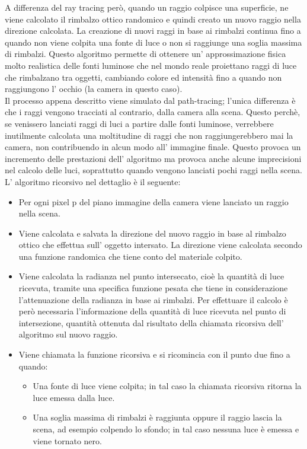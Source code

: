 A differenza del ray tracing però, quando un raggio colpisce una superficie, ne viene calcolato il rimbalzo ottico randomico e quindi creato un  nuovo raggio nella direzione calcolata. 
La creazione di nuovi raggi in base ai rimbalzi continua fino a quando non viene colpita una fonte di luce o non si raggiunge una soglia massima di rimbalzi.
Questo algoritmo permette di ottenere un’ approssimazione fisica molto realistica delle fonti luminose che nel mondo reale  proiettano raggi di luce che rimbalzano tra oggetti, cambiando colore ed intensità fino a quando non raggiungono l’ occhio (la camera in questo caso).
\\
Il processo appena descritto viene simulato dal path-tracing; l’unica differenza è che i raggi vengono tracciati al contrario, dalla camera alla scena. Questo perchè, se venissero lanciati raggi di luci a partire dalle fonti luminose, verrebbere inutilmente calcolata una moltitudine di raggi che non raggiungerebbero mai la camera, non contribuendo in alcun modo all’ immagine finale.
Questo provoca un incremento delle prestazioni dell’ algoritmo ma provoca anche alcune imprecisioni nel calcolo delle luci, soprattutto quando vengono lanciati pochi raggi nella scena.
\\
L’ algoritmo ricorsivo nel dettaglio è il seguente:
\begin{itemize}
\item Per ogni pixel p del piano immagine della camera viene lanciato un raggio nella scena.
\item Viene calcolata e salvata la direzione del nuovo raggio in base al rimbalzo ottico che effettua sull’ oggetto intersato. La direzione viene calcolata secondo una funzione randomica che tiene conto del materiale colpito.
\item Viene calcolata la radianza nel punto intersecato, cioè la quantità di luce ricevuta,  tramite una specifica funzione pesata che tiene in considerazione l’attenuazione della radianza in base ai rimbalzi. Per effettuare il calcolo è però necessaria l’informazione della quantità di luce ricevuta nel punto di intersezione, quantità ottenuta dal risultato della chiamata ricorsiva dell’ algoritmo sul nuovo raggio.
\item Viene chiamata la funzione ricorsiva e si ricomincia con il punto due fino a quando:
\begin{itemize}
\item Una fonte di luce viene colpita; in tal caso la chiamata ricorsiva ritorna la luce emessa dalla luce.
\item Una soglia massima di rimbalzi è raggiunta oppure il raggio lascia la scena, ad esempio colpendo lo sfondo; in tal caso nessuna luce è emessa e viene tornato nero.
\end{itemize}
\end{itemize}

